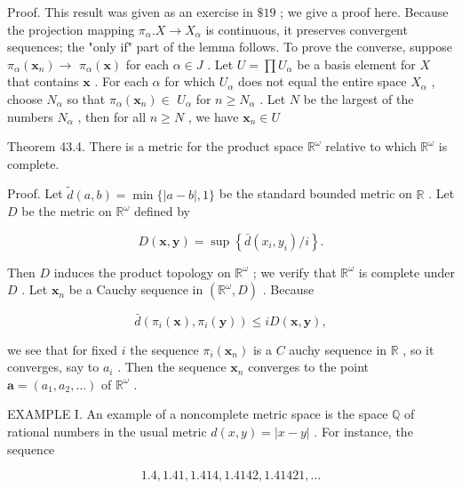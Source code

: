 Proof. This result was given as an exercise in \(\$ {19}\) ; we give a proof here. Because the projection mapping \({\pi }_{\alpha }.X \rightarrow  {X}_{\alpha }\) is continuous, it preserves convergent sequences; the "only if" part of the lemma follows. To prove the converse, suppose \({\pi }_{\alpha }\left( {\mathbf{x}}_{n}\right)  \rightarrow\)  \({\pi }_{\alpha }\left( \mathbf{x}\right)\) for each \(\alpha  \in  J\) . Let \(U = \prod {U}_{\alpha }\) be a basis element for \(X\) that contains \(\mathbf{x}\) . For each \(\alpha\) for which \({U}_{\alpha }\) does not equal the entire space \({X}_{\alpha }\) , choose \({N}_{\alpha }\) so that \({\pi }_{\alpha }\left( {\mathbf{x}}_{n}\right)  \in\)  \({U}_{\alpha }\) for \(n \geq  {N}_{\alpha }\) . Let \(N\) be the largest of the numbers \({N}_{\alpha }\) , then for all \(n \geq  N\) , we have \({\mathbf{x}}_{n} \in  U\)

Theorem 43.4. There is a metric for the product space \({\mathbb{R}}^{\omega }\) relative to which \({\mathbb{R}}^{\omega }\) is complete.

Proof. Let \(\widetilde{d}\left( {a,b}\right)  = \min \{ \left| {a - b}\right| ,1\}\) be the standard bounded metric on \(\mathbb{R}\) . Let \(D\) be the metric on \({\mathbb{R}}^{\omega }\) defined by

\[
D\left( {\mathbf{x},\mathbf{y}}\right)  = \sup \left\{  {\bar{d}\left( {{x}_{i},{y}_{i}}\right) /i}\right\}  .
\]

Then \(D\) induces the product topology on \({\mathbb{R}}^{\omega }\) ; we verify that \({\mathbb{R}}^{\omega }\) is complete under \(D\) . Let \({\mathbf{x}}_{n}\) be a Cauchy sequence in \(\left( {{\mathbb{R}}^{\omega },D}\right)\) . Because

\[
\bar{d}\left( {{\pi }_{i}\left( \mathbf{x}\right) ,{\pi }_{i}\left( \mathbf{y}\right) }\right)  \leq  {iD}\left( {\mathbf{x},\mathbf{y}}\right) ,
\]

we see that for fixed \(i\) the sequence \({\pi }_{i}\left( {\mathbf{x}}_{n}\right)\) is a \(C\) auchy sequence in \(\mathbb{R}\) , so it converges, say to \({a}_{i}\) . Then the sequence \({\mathbf{x}}_{n}\) converges to the point \(\mathbf{a} = \left( {{a}_{1},{a}_{2},\ldots }\right)\) of \({\mathbb{R}}^{\omega }\) .

EXAMPLE I. An example of a noncomplete metric space is the space \(\mathbb{Q}\) of rational numbers in the usual metric \(d\left( {x,y}\right)  = \left| {x - y}\right|\) . For instance, the sequence

\[
{1.4},{1.41},{1.414},{1.4142},{1.41421},\ldots
\]

